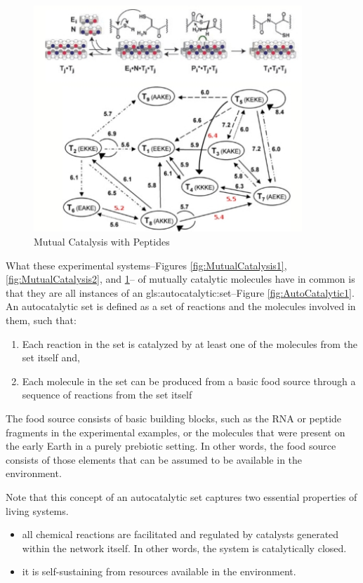 \documentclass[]{article}
\begin{document}
\begin{figure}[H]
	\caption[Mutual Catalysis with Peptides]{Mutual Catalysis with Peptides\cite{ashkenasy2004design}}\label{fig:MutualCatalysis3}
	\includegraphics[width=0.9\textwidth]{MutualCatalysis3}
\end{figure}

What these experimental systems--Figures \ref{fig:MutualCatalysis1}, \ref{fig:MutualCatalysis2}, and \ref{fig:MutualCatalysis3}--
of mutually catalytic molecules
have in common is that
they are all instances
of an \gls{gls:autocatalytic:set}--Figure \ref{fig:AutoCatalytic1}.
An autocatalytic set is defined as
a set of reactions
and the molecules involved in them,
such that:
\begin{enumerate}
	\item Each reaction in the set is catalyzed
	by at least one of the molecules
	from the set itself
	and,
	\item Each molecule in the set
	can be produced
	from a basic food source
	through a sequence of reactions
	from the set itself
\end{enumerate}
The food source consists of
basic building blocks,
such as the RNA or peptide fragments
in the experimental examples,
or the molecules that were present
on the early Earth
in a purely prebiotic setting.
In other words, the food source
consists of those elements
that can be assumed to be available
in the environment.

Note that this concept of an autocatalytic set captures two essential properties of living systems.

\begin{itemize}
	\item all chemical reactions are facilitated and regulated by catalysts generated
	within the network itself. In other words, the system is catalytically closed.

	\item  it is self-sustaining from resources available in the environment.
\end{itemize}
\end{document}
